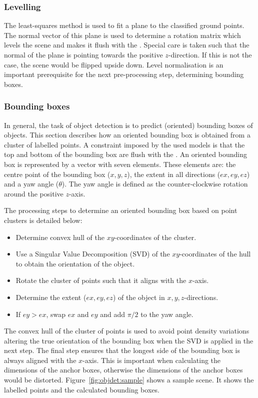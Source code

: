 \subsubsection{Levelling}
The least-squares method is used to fit a plane to the classified ground points. The normal vector of this plane is used to determine a rotation matrix which levels the scene and makes it flush with the \xyplane{}. Special care is taken such that the normal of the plane is pointing towards the positive $z$-direction. If this is not the case, the scene would be flipped upside down. Level normalisation is an important prerequisite for the next pre-processing step, determining bounding boxes.

\subsubsection{Bounding boxes}
In general, the task of object detection is to predict (oriented) bounding boxes of objects. This section describes how an oriented bounding box is obtained from a cluster of labelled points. A constraint imposed by the used models is that the top and bottom of the bounding box are flush with the \xyplane{}. An oriented bounding box is represented by a vector with seven elements. These elements are: the centre point of the bounding box ($x,y,z$), the extent in all directions ($ex, ey, ez$) and a yaw angle ($\theta$). The yaw angle is defined as the counter-clockwise rotation around the positive $z$-axis.

The processing steps to determine an oriented bounding box based on point clusters is detailed below:

\begin{itemize}
    \item Determine convex hull of the \(xy\)-coordinates of the cluster.
    \item Use a Singular Value Decomposition (SVD) of the \(xy\)-coordinates of the hull to obtain the orientation of the object.
    \item Rotate the cluster of points such that it aligns with the \(x\)-axis.
    \item Determine the extent (\(ex, ey, ez\)) of the object in \(x, y, z\)-directions.
    \item If \(ey > ex\), swap \(ex\) and \(ey\) and add \(\pi/2\) to the yaw angle.
\end{itemize}

The convex hull of the cluster of points is used to avoid point density variations altering the true orientation of the bounding box when the SVD is applied in the next step. The final step ensures that the longest side of the bounding box is always aligned with the \(x\)-axis. This is important when calculating the dimensions of the anchor boxes, otherwise the dimensions of the anchor boxes would be distorted. Figure~\ref{fig:objdet:sample} shows a sample scene. It shows the labelled points and the calculated bounding boxes.

